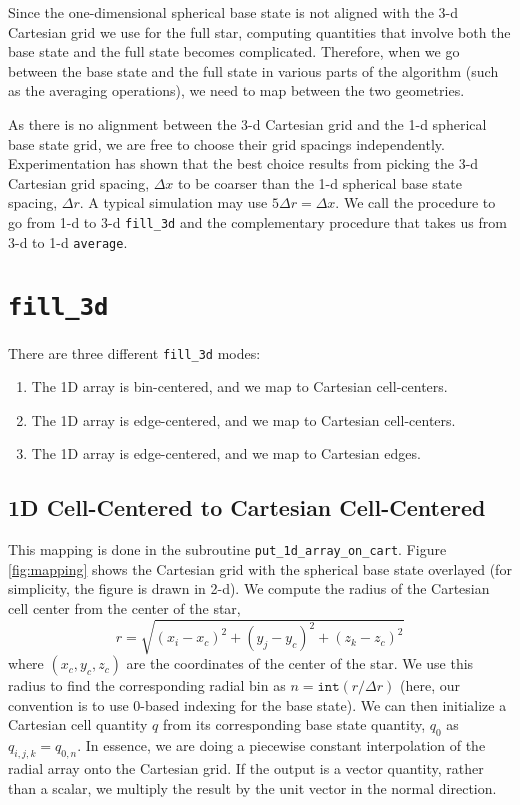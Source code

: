 Since the one-dimensional spherical base state is not aligned with the
3-d Cartesian grid we use for the full star, computing quantities that
involve both the base state and the full state becomes complicated.
Therefore, when we go between the base state and the full state in
various parts of the algorithm (such as the averaging operations), we
need to map between the two geometries.

As there is no alignment between the 3-d Cartesian grid and the 1-d
spherical base state grid, we are free to choose their grid spacings
independently.  Experimentation has shown that the best choice results
from picking the 3-d Cartesian grid spacing, $\Delta x$ to be coarser
than the 1-d spherical base state spacing, $\Delta r$.
A typical simulation may use $5 \Delta r = \Delta x$.
We call the procedure to go from 1-d to 3-d {\tt fill\_3d} and the
complementary procedure that takes us from 3-d to 1-d {\tt average}.
\section{\tt fill\_3d}
There are three different {\tt fill\_3d} modes:
\begin{enumerate}
\item The 1D array is bin-centered, and we map to Cartesian cell-centers.
\item The 1D array is edge-centered, and we map to Cartesian cell-centers.
\item The 1D array is edge-centered, and we map to Cartesian edges.  
\end{enumerate}
\subsection{1D Cell-Centered to Cartesian Cell-Centered}
This mapping is done in the subroutine {\tt put\_1d\_array\_on\_cart}.
Figure \ref{fig:mapping} shows the Cartesian grid with the spherical
base state overlayed (for simplicity, the figure is drawn in 2-d).  
We compute the radius of the Cartesian cell center from the center of the star,
\begin{equation}
r = \sqrt{(x_i - x_c)^2 + (y_j - y_c)^2 + (z_k - z_c)^2}
\end{equation}
where $(x_c, y_c, z_c)$ are the coordinates of the center of the star.
We use this radius to find the corresponding radial bin as $n = \mathtt{int}(r
/ \Delta r)$ (here, our convention is to use 0-based indexing for the
base state).  We can then initialize a Cartesian cell quantity $q$ from its
corresponding base state quantity, $q_0$ as $q_{i,j,k} = q_{0,n}$.  In essence,
we are doing a piecewise constant interpolation of the radial array onto the 
Cartesian grid.  If the output is a vector quantity, rather than a scalar, we
multiply the result by the unit vector in the normal direction.
